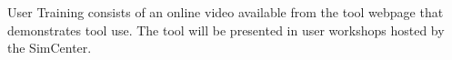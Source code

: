 User Training consists of an online video available from the tool
webpage that demonstrates tool use. The tool will be presented in user
workshops hosted by the SimCenter.
